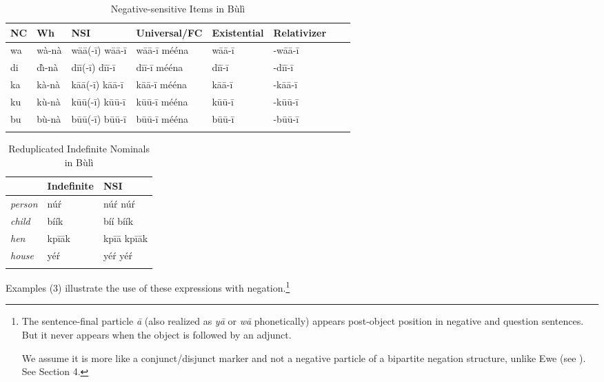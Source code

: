\documentclass[output=paper,colorlinks,citecolor=brown]{langscibook}
\begin{document}
\begin{table}
  \begin{tabularx}{\textwidth}{l@{~~~~~~}l@{~~~~~~}l@{~~~~~~}l@{~~~~~~}l@{~~~~~~}l@{~~~~~~}l@{~~~~~~}l}
\lspbottomrule
NC  &  Wh  &  NSI  &  Universal/FC & Existential & Relativizer    \\
  \midrule
wa & wà-nà &   wāā(-ī) wāā-ī &    wāā-ī mééna & wāā-ī & -wāā-ī  \\
di &  d\`{\i}-nà & dīī(-ī)  dīī-ī &  dīī-ī mééna & dīī-ī & -dīī-ī    \\
ka &  kà-nà &  kāā(-ī)  kāā-ī  & kāā-ī mééna &  kāā-ī & -kāā-ī   \\
ku &  kù-nà &  k\=u\=u(-ī)  k\=u\=u-ī  & k\=u\=u-ī mééna & k\=u\=u-ī & -k\=u\=u-ī  \\
bu &  bù-nà &  b\=u\=u(-ī)  b\=u\=u-ī  &  b\=u\=u-ī mééna  & b\=u\=u-ī &  -b\=u\=u-ī \\
\lspbottomrule
  \end{tabularx}
  \caption{Negative-sensitive Items in Bùlì}
\end{table}

\begin{table}
  \begin{tabular}{lll}
\lspbottomrule
  & Indefinite   & NSI     \\
  \midrule
\textit{person} & n\'u\'r &  n\'u\'r n\'u\'r \\
\textit{child} &  bíík &  bíí bíík \\
\textit{hen} &  kpīāk &  kpīā kpīāk \\
\textit{house} &  yé\'r &  yé\'r yé\'r \\
\lspbottomrule
  \end{tabular}
  \caption{Reduplicated Indefinite Nominals in Bùlì}
\end{table}

Examples (3) illustrate the use of these expressions with negation.\footnote{The sentence-final particle \textit{ā} (also realized as \textit{yā} or \textit{wā} phonetically) appears post-object position in negative and question sentences. But it never appears when the object is followed by an adjunct.
\z

We assume it is more like a conjunct/disjunct marker and not a negative particle of a bipartite negation structure, unlike Ewe (see \citealt{CollinsEtAl2017}). See Section 4.  }
\end{document}
